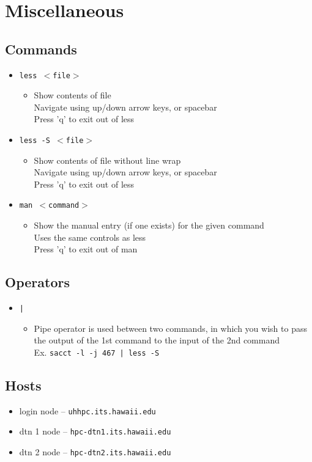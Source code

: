\documentclass[11pt,twocolumn]{article}
\newcommand{\lft}{$<$}
\newcommand{\rht}{$>$}
\newcommand{\pth}[1]{{\lft}#1{\rht}}
\newcommand{\desc}[1]{\small \begin{itemize}\item[]#1\end{itemize}}
\begin{document}
\section{Miscellaneous}
\subsection{Commands}
\begin{itemize}
\item[] \texttt{less \pth{file}} \desc{Show contents of file\\Navigate using up/down arrow keys, or spacebar\\Press 'q' to exit out of less}
\item[] \texttt{less -S \pth{file}} \desc{Show contents of file without line wrap\\Navigate using up/down arrow keys, or spacebar\\Press 'q' to exit out of less}
\item[] \texttt{man \pth{command}} \desc{Show the manual entry (if one exists) for the given command\\Uses the same controls as less\\Press 'q' to exit out of man}
\end{itemize}

\subsection{Operators}
\begin{itemize}
\item[] \texttt{|} \desc{Pipe operator is used between two commands, in which you wish to pass the output of the 1st command to the input of the 2nd command\\Ex. \texttt{sacct -l -j 467 | less -S }}
\end{itemize}

\subsection{Hosts}
\begin{itemize}
\item[] login node -- \texttt{uhhpc.its.hawaii.edu}
\item[] dtn 1 node -- \texttt{hpc-dtn1.its.hawaii.edu}
\item[] dtn 2 node -- \texttt{hpc-dtn2.its.hawaii.edu}

\end{itemize}
\end{document}
